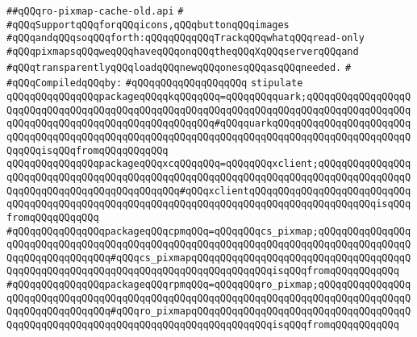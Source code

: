 \label{src/lib/x-kit/widget/old/lib/ro-pixmap-cache-old.api}
\verb|##qQQqro-pixmap-cache-old.api|\newline
\verb|#|\newline
\verb|#qQQqSupportqQQqforqQQqicons,qQQqbuttonqQQqimages|\newline
\verb|#qQQqandqQQqsoqQQqforth:qQQqqQQqqQQqTrackqQQqwhatqQQqread-only|\newline
\verb|#qQQqpixmapsqQQqweqQQqhaveqQQqonqQQqtheqQQqXqQQqserverqQQqand|\newline
\verb|#qQQqtransparentlyqQQqloadqQQqnewqQQqonesqQQqasqQQqneeded.|\newline
\verb|#|\newline
\newline
\verb|#qQQqCompiledqQQqby:|\newline
\verb|#qQQqqQQqqQQqqQQqqQQq|\newline
\newline
\verb|stipulate|\newline
\verb|qQQqqQQqqQQqqQQqpackageqQQqqkqQQqqQQq=qQQqqQQqquark;qQQqqQQqqQQqqQQqqQQqqQQqqQQqqQQqqQQqqQQqqQQqqQQqqQQqqQQqqQQqqQQqqQQqqQQqqQQqqQQqqQQqqQQqqQQqqQQqqQQqqQQqqQQqqQQqqQQqqQQqqQQq#qQQqquarkqQQqqQQqqQQqqQQqqQQqqQQqqQQqqQQqqQQqqQQqqQQqqQQqqQQqqQQqqQQqqQQqqQQqqQQqqQQqqQQqqQQqqQQqqQQqqQQqqQQqisqQQqfromqQQqqQQqqQQq|\newline
\verb|qQQqqQQqqQQqqQQqpackageqQQqxcqQQqqQQq=qQQqqQQqxclient;qQQqqQQqqQQqqQQqqQQqqQQqqQQqqQQqqQQqqQQqqQQqqQQqqQQqqQQqqQQqqQQqqQQqqQQqqQQqqQQqqQQqqQQqqQQqqQQqqQQqqQQqqQQqqQQqqQQq#qQQqxclientqQQqqQQqqQQqqQQqqQQqqQQqqQQqqQQqqQQqqQQqqQQqqQQqqQQqqQQqqQQqqQQqqQQqqQQqqQQqqQQqqQQqqQQqqQQqisqQQqfromqQQqqQQqqQQq|\newline
\verb|#qQQqqQQqqQQqqQQqpackageqQQqcpmqQQq=qQQqqQQqcs_pixmap;qQQqqQQqqQQqqQQqqQQqqQQqqQQqqQQqqQQqqQQqqQQqqQQqqQQqqQQqqQQqqQQqqQQqqQQqqQQqqQQqqQQqqQQqqQQqqQQqqQQqqQQq#qQQqcs_pixmapqQQqqQQqqQQqqQQqqQQqqQQqqQQqqQQqqQQqqQQqqQQqqQQqqQQqqQQqqQQqqQQqqQQqqQQqqQQqqQQqqQQqisqQQqfromqQQqqQQqqQQq|\newline
\verb|#qQQqqQQqqQQqqQQqpackageqQQqrpmqQQq=qQQqqQQqro_pixmap;qQQqqQQqqQQqqQQqqQQqqQQqqQQqqQQqqQQqqQQqqQQqqQQqqQQqqQQqqQQqqQQqqQQqqQQqqQQqqQQqqQQqqQQqqQQqqQQqqQQqqQQq#qQQqro_pixmapqQQqqQQqqQQqqQQqqQQqqQQqqQQqqQQqqQQqqQQqqQQqqQQqqQQqqQQqqQQqqQQqqQQqqQQqqQQqqQQqqQQqisqQQqfromqQQqqQQqqQQq|\newline
